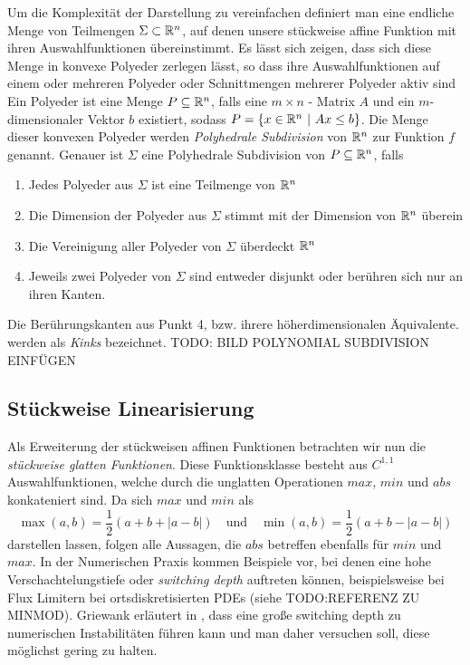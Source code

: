 Um die Komplexität der Darstellung zu vereinfachen definiert man eine endliche Menge von Teilmengen $\Sigma\subset \mathbb{R}^n$, auf denen unsere stückweise affine Funktion mit ihren Auswahlfunktionen übereinstimmt. Es lässt sich zeigen, dass sich diese Menge in konvexe Polyeder zerlegen lässt, so dass ihre Auswahlfunktionen auf einem oder mehreren Polyeder oder Schnittmengen mehrerer Polyeder aktiv sind \cite[S.23 ff.]{scholtes2012introduction}
Ein Polyeder ist eine Menge $P\subseteq \mathbb{R}^n$, falls eine $m\times n$ - Matrix $A$ und ein $m$-dimensionaler Vektor $b$ existiert, sodass $P = \lbrace x\in \mathbb{R}^n ~|~ Ax\leq b \rbrace$.
Die Menge dieser konvexen Polyeder werden \textit{Polyhedrale Subdivision} von $\mathbb{R}^n$ zur Funktion $f$ genannt. Genauer ist $\Sigma$ eine Polyhedrale Subdivision von $P \subseteq \mathbb{R}^n$, falls
\begin{enumerate}
 \item Jedes Polyeder aus $\Sigma$ ist eine Teilmenge von $\mathbb{R}^n$
 \item Die Dimension der Polyeder aus $\Sigma$ stimmt mit der Dimension von $\mathbb{R}^n$ überein
 \item Die Vereinigung aller Polyeder von $\Sigma$ überdeckt $\mathbb{R}^n$
 \item Jeweils zwei Polyeder von $\Sigma$ sind entweder disjunkt oder berühren sich nur an ihren Kanten.
\end{enumerate}
Die Berührungskanten aus Punkt 4, bzw. ihrere höherdimensionalen Äquivalente. werden als \textit{Kinks} bezeichnet. 
TODO: BILD POLYNOMIAL SUBDIVISION EINFÜGEN




\subsection{Stückweise Linearisierung}
Als Erweiterung der stückweisen affinen Funktionen betrachten wir nun die \textit{stückweise glatten Funktionen}. Diese Funktionsklasse besteht aus $C^{1,1}$ Auswahlfunktionen, welche durch die unglatten Operationen $max$, $min$ und $abs$ konkateniert sind. Da sich $max$ und $min$ als
\[
\max(a,b) = \frac{1}{2}(a+b + |a-b|)\quad \text{und} \quad \min(a,b) = \frac{1}{2}(a+b - |a-b|)
\]
darstellen lassen, folgen alle Aussagen, die $abs$ betreffen ebenfalls für $min$ und $max$.
In der Numerischen Praxis kommen Beispiele vor, bei denen eine hohe Verschachtelungstiefe oder \textit{switching depth} auftreten können, beispielsweise bei Flux Limitern bei ortsdiskretisierten PDEs (siehe TODO:REFERENZ ZU MINMOD). Griewank erläutert in \cite{monster}, dass eine große switching depth zu numerischen Instabilitäten führen kann und man daher versuchen soll, diese möglichst gering zu halten.

